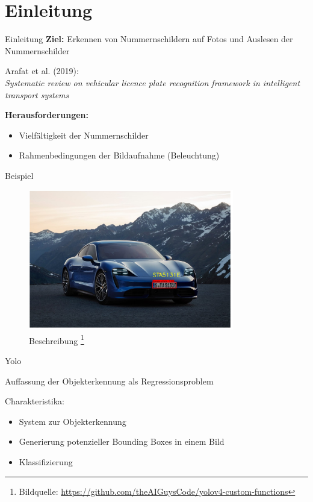 \section{Einleitung}

\begin{frame}{Einleitung}
    \textbf{Ziel:} Erkennen von Nummernschildern auf Fotos und Auslesen der Nummernschilder
    
    Arafat et al. (2019):\\
\textit{Systematic review on vehicular licence plate recognition framework in intelligent transport systems}~\cite{arafat}
    
    \textbf{Herausforderungen:}
    \begin{itemize}
        \item Vielfältigkeit der Nummernschilder
        \item Rahmenbedingungen der Bildaufnahme (Beleuchtung)
    \end{itemize}
\end{frame}

\begin{frame}{Beispiel}
  \begin{figure}
    \begin{center}
      \includegraphics[width=0.8\textwidth]{bilder/Bild2}
      \caption{Beschreibung
      \footnote{Bildquelle: \url{https://github.com/theAIGuysCode/yolov4-custom-functions}}}
    \end{center}
  \end{figure}
\end{frame}

\begin{frame}{Yolo}
    
    Auffassung der Objekterkennung als Regressionsproblem 
    
    Charakteristika:
    \begin{itemize}
        \item System zur Objekterkennung 
        \item Generierung potenzieller Bounding Boxes in einem Bild
        \item Klassifizierung
    \end{itemize}
\end{frame}